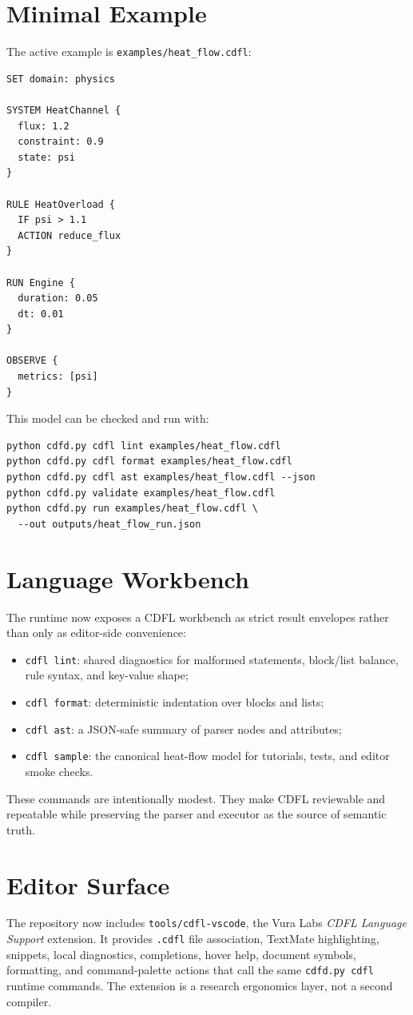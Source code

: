 \documentclass[12pt,a4paper]{article}
\begin{document}
\section{Minimal Example}
The active example is \texttt{examples/heat\_flow.cdfl}:
\begin{verbatim}
SET domain: physics

SYSTEM HeatChannel {
  flux: 1.2
  constraint: 0.9
  state: psi
}

RULE HeatOverload {
  IF psi > 1.1
  ACTION reduce_flux
}

RUN Engine {
  duration: 0.05
  dt: 0.01
}

OBSERVE {
  metrics: [psi]
}
\end{verbatim}

This model can be checked and run with:
\begin{verbatim}
python cdfd.py cdfl lint examples/heat_flow.cdfl
python cdfd.py cdfl format examples/heat_flow.cdfl
python cdfd.py cdfl ast examples/heat_flow.cdfl --json
python cdfd.py validate examples/heat_flow.cdfl
python cdfd.py run examples/heat_flow.cdfl \
  --out outputs/heat_flow_run.json
\end{verbatim}

\section{Language Workbench}
The runtime now exposes a CDFL workbench as strict result envelopes rather than
only as editor-side convenience:
\begin{itemize}
    \item \texttt{cdfl lint}: shared diagnostics for malformed statements,
    block/list balance, rule syntax, and key-value shape;
    \item \texttt{cdfl format}: deterministic indentation over blocks and lists;
    \item \texttt{cdfl ast}: a JSON-safe summary of parser nodes and attributes;
    \item \texttt{cdfl sample}: the canonical heat-flow model for tutorials,
    tests, and editor smoke checks.
\end{itemize}
These commands are intentionally modest. They make CDFL reviewable and
repeatable while preserving the parser and executor as the source of semantic
truth.

\section{Editor Surface}
The repository now includes \texttt{tools/cdfl-vscode}, the Vura Labs
\emph{CDFL Language Support} extension. It provides \texttt{.cdfl} file
association, TextMate highlighting, snippets, local diagnostics, completions,
hover help, document symbols, formatting, and command-palette actions that call
the same \texttt{cdfd.py cdfl} runtime commands. The extension is a research
ergonomics layer, not a second compiler.
\end{document}

